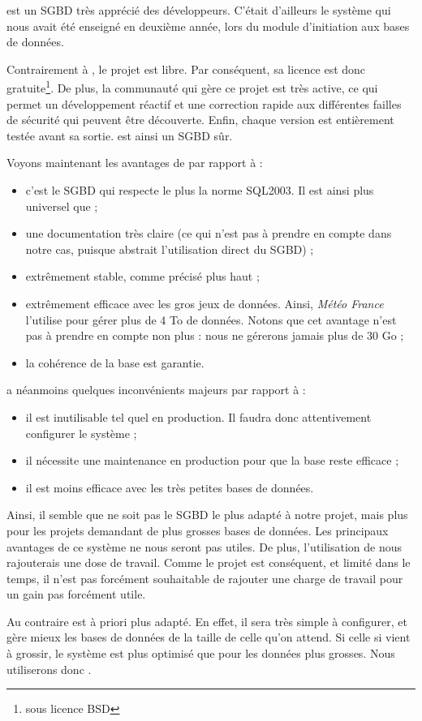 \psql est un SGBD très apprécié des développeurs. C'était d'ailleurs le système qui nous avait été enseigné en deuxième année, lors du module d'initiation aux bases de données. 

Contrairement à \mysql, le projet est libre. Par conséquent, sa licence est donc gratuite\footnote{sous licence BSD}. De plus, la communauté qui gère ce projet est très active, ce qui permet un développement réactif et une correction rapide aux différentes failles de sécurité qui peuvent être découverte. 
Enfin, chaque version est entièrement testée avant sa sortie. \psql est ainsi un SGBD sûr. 

\smallbreak

Voyons maintenant les avantages de \psql par rapport à \mdb : 

\begin{itemize}
\item c'est le SGBD qui respecte le plus la norme SQL2003. Il est ainsi plus universel que \mdb ;
\item une documentation très claire (ce qui n'est pas à prendre en compte dans notre cas, puisque \symfony abstrait l'utilisation direct du SGBD) ;
\item extrêmement stable, comme précisé plus haut ;
\item extrêmement efficace avec les gros jeux de données. Ainsi, \textit{Météo France} l'utilise pour gérer plus de 4 To de données. Notons que cet avantage n'est pas à prendre en compte non plus : nous ne gérerons jamais plus de 30 Go ;
\item la cohérence de la base est garantie.
\end{itemize}

\psql a néanmoins quelques inconvénients majeurs  par rapport à \mdb : 

\begin{itemize}
\item il est inutilisable tel quel en production. Il faudra donc attentivement configurer le système ;
\item il nécessite une maintenance en production pour que la base reste efficace ;
\item il est moins efficace avec les très petites bases de données.  
\end{itemize}

\bigbreak
Ainsi, il semble que \psql ne soit pas le SGBD le plus adapté à notre projet, mais plus pour les projets demandant de plus grosses bases de données. 
Les principaux avantages de ce système ne nous seront pas utiles. De plus, l'utilisation de \psql nous rajouterais une dose de travail. Comme le projet est conséquent, et limité dans le temps, il n'est pas forcément souhaitable de rajouter une charge de travail pour un gain pas forcément utile. 

Au contraire \mdb est à priori plus adapté. En effet, il sera très simple à configurer, et gère mieux les bases de données de la taille de celle qu'on attend. Si celle si vient à grossir, le système est plus optimisé que \mysql pour les données plus grosses. Nous utiliserons donc \mdb. 
